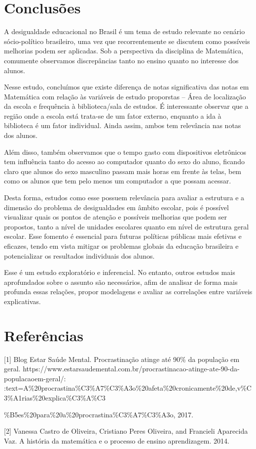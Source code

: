 \documentclass[a4paper, 12pt]{article} %
\begin{document}
\newpage
\section{Conclusões}
A desigualdade educacional no Brasil é um tema de estudo relevante no cenário sócio-político brasileiro, uma vez que recorrentemente se discutem como possíveis melhorias podem ser aplicadas. Sob a perspectiva da disciplina de Matemática, comumente observamos discrepâncias tanto no ensino quanto no interesse dos alunos. 

Nesse estudo, concluímos que existe diferença de notas significativa das notas em Matemática com relação às variáveis de estudo proporstas -- Área de localização da escola e frequência à biblioteca/sala de estudos. É interessante observar que a região onde a escola está trata-se de um fator externo, enquanto a ida à biblioteca é um fator individual. Ainda assim, ambos tem relevância nas notas dos alunos.

Além disso, também observamos que o tempo gasto com dispositivos eletrônicos tem influência tanto do acesso ao computador quanto do sexo do aluno, ficando claro que alunos do sexo masculino passam mais horas em frente às telas, bem como os alunos que tem pelo menos um computador a que possam acessar.

Desta forma, estudos como esse possuem relevância para avaliar a estrutura e a dimensão do problema de desigualdades em âmbito escolar, pois é possível visualizar quais os pontos de atenção e possíveis melhorias que podem ser propostos, tanto a nível de unidades escolares quanto em nível de estrutura geral escolar. Esse fomento é essencial para futuras políticas públicas mais efetivas e eficazes, tendo em vista mitigar os problemas globais da educação brasileira e potencializar os resultados individuais dos alunos.

Esse é um estudo exploratório e inferencial. No entanto, outros estudos mais aprofundados sobre o assunto são necessários, afim de analisar de forma mais profunda essas relações, propor modelagens e avaliar as correlações entre variáveis explicativas.


\section{Referências}

[1] Blog Estar Saúde Mental. Procrastinação atinge até 90\% da população em geral.
https://www.estarsaudemental.com.br/procrastinacao-atinge-ate-90-da-populacaoem-geral/: :text=A\%20procrastina\%C3\%A7\%C3\%A3o\%20afeta\%20cronicamente\%20de,v\%C3\%A1rias\%20explica\%C3\%A\%C3

\%B5es\%20para\%20a\%20procrastina\%C3\%A7\%C3\%A3o, 2017.


[2] Vanessa Castro de Oliveira, Cristiano Peres Oliveira, and Francieli Aparecida Vaz. A história da matemática e o processo de ensino aprendizagem. 2014.
\end{document}
